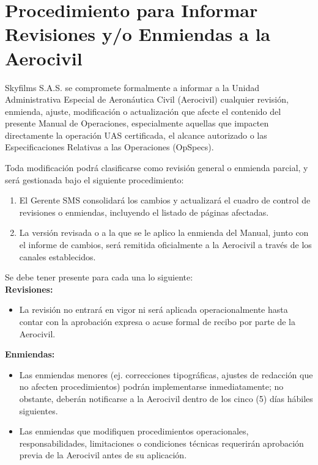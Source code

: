 \section{Procedimiento para Informar Revisiones y/o Enmiendas a la Aerocivil}

Skyfilms S.A.S. se compromete formalmente a informar a la Unidad Administrativa Especial de Aeronáutica Civil (Aerocivil) cualquier revisión, enmienda, ajuste, modificación o actualización que afecte el contenido del presente Manual de Operaciones, especialmente aquellas que impacten directamente la operación UAS certificada, el alcance autorizado o las Especificaciones Relativas a las Operaciones (OpSpecs).

Toda modificación podrá clasificarse como revisión general o enmienda parcial, y será gestionada bajo el siguiente procedimiento:

\begin{enumerate}
    \item El Gerente SMS consolidará los cambios y actualizará el cuadro de control de revisiones o enmiendas, incluyendo el listado de páginas afectadas.
    \item La versión revisada o a la que se le aplico la enmienda del Manual, junto con el informe de cambios, será remitida oficialmente a la Aerocivil a través de los canales establecidos.
\end{enumerate}

Se debe tener presente para cada una lo siguiente:\\

\textbf{Revisiones:}
\begin{itemize}
    \item La revisión no entrará en vigor ni será aplicada operacionalmente hasta contar con la aprobación expresa o acuse formal de recibo por parte de la Aerocivil.
\end{itemize}
    
\textbf{Enmiendas:}
\begin{itemize}
    \item Las enmiendas menores (ej. correcciones tipográficas, ajustes de redacción que no afecten procedimientos)  podrán implementarse inmediatamente; no obstante, deberán notificarse a la Aerocivil dentro de los cinco (5) días hábiles siguientes.
    \item Las enmiendas que modifiquen procedimientos operacionales, responsabilidades, limitaciones o condiciones técnicas requerirán aprobación previa de la Aerocivil antes de su aplicación.
\end{itemize}

